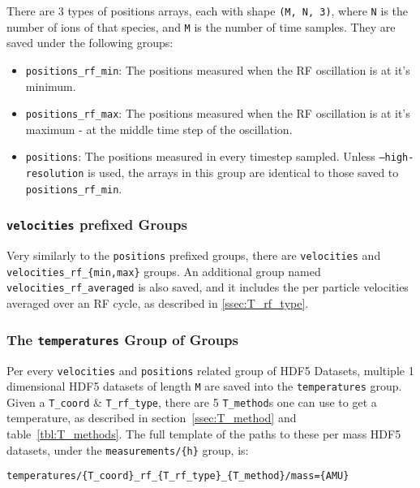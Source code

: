 There are 3 types of positions arrays, each with shape \texttt{(M, N, 3)}, where \texttt{N} is the number of ions of that species, and \texttt{M} is the number of time samples. They are saved under the following groups:

\begin{itemize}
	\item \texttt{positions\_rf\_min}: The positions measured when the RF oscillation is at it's minimum.
	\item \texttt{positions\_rf\_max}: The positions measured when the RF oscillation is at it's maximum - at the middle time step of the oscillation.
	\item \texttt{positions}: The positions measured in every timestep sampled. Unless \texttt{--high-resolution} is used, the arrays in this group are identical to those saved to \texttt{positions\_rf\_min}.
\end{itemize}

\subsubsection{\texttt{velocities} prefixed Groups}

Very similarly to the \texttt{positions} prefixed groups, there are \texttt{velocities} and \texttt{velocities\_rf\_\{min,max\}} groups. An additional group named \texttt{velocities\_rf\_averaged} is also saved, and it includes the per particle velocities averaged over an RF cycle, as described in \ref{ssec:T_rf_type}.

\subsubsection{The \texttt{temperatures} Group of Groups}

Per every \texttt{velocities} and \texttt{positions} related group of HDF5 Datasets, multiple 1 dimensional HDF5 datasets of length \texttt{M} are saved into the \texttt{temperatures} group. Given a \texttt{T\_coord} \& \texttt{T\_rf\_type}, there are 5 \texttt{T\_method}s one can use to get a temperature, as described in section~\ref{ssec:T_method} and table~\ref{tbl:T_methods}. The full template of the paths to these per mass HDF5 datasets, under the \texttt{measurements/\{h\}} group, is:

\begin{verbatim}
temperatures/{T_coord}_rf_{T_rf_type}_{T_method}/mass={AMU}
\end{verbatim}

